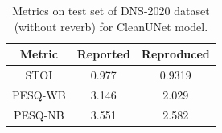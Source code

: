\begin{table}[h]
  \centering
  \begin{tabular}{c|c|c}
    \hline
    Metric  & Reported & Reproduced \\
    \hline

    STOI    & 0.977    & 0.9319     \\
    PESQ-WB & 3.146    & 2.029      \\
    PESQ-NB & 3.551    & 2.582      \\
    \hline
  \end{tabular}
  \caption{Metrics on test set of DNS-2020 dataset (without reverb) for CleanUNet model.}
  \label{tab:cleanunet-test}

\end{table}